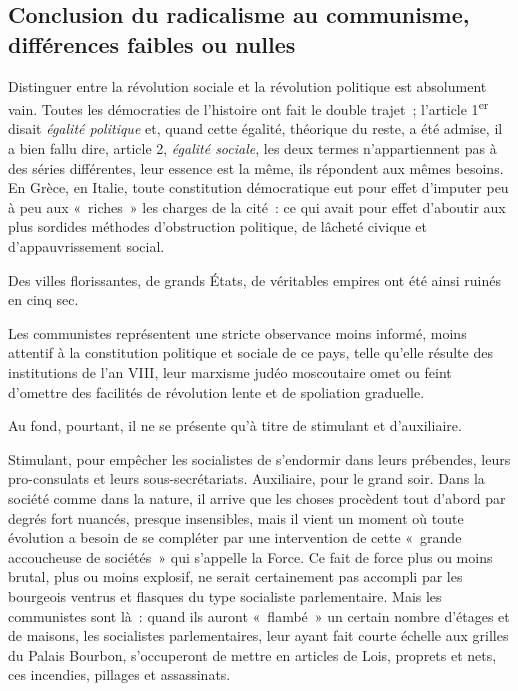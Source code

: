 \documentclass[french,twoside]{book} %
\newcommand{\astermono}{\medskip\centerline{\color{rubric}\large\selectfont{\syms ✻}}\medskip\par}%
\begin{document}
\astermono

\subsection[Conclusion du radicalisme au communisme, différences faibles ou nulles]{Conclusion du radicalisme au communisme, différences faibles ou nulles}
\noindent Distinguer entre la révolution sociale et la révolution politique est absolument vain. Toutes les démocraties de l’histoire ont fait le double trajet ; l’article 1\textsuperscript{er} disait \emph{égalité politique} et, quand cette égalité, théorique du reste, a été admise, il a bien fallu dire, article 2, \emph{égalité sociale}, les deux termes n’appartiennent pas à des séries différentes, leur essence est la même, ils répondent aux mêmes besoins. En Grèce, en Italie, toute constitution démocratique eut pour effet d’imputer peu à peu aux « riches » les charges de la cité : ce qui avait pour effet d’aboutir aux plus sordides méthodes d’obstruction politique, de lâcheté civique et d’appauvrissement social.\par
Des villes florissantes, de grands États, de véritables empires ont été ainsi ruinés en cinq sec.\par

\astermono

\noindent Les communistes représentent une stricte observance moins informé, moins attentif à la constitution politique et sociale de ce pays, telle qu’elle résulte des institutions de l’an VIII, leur marxisme judéo moscoutaire omet ou feint d’omettre des facilités de révolution lente et de spoliation graduelle.\par
Au fond, pourtant, il ne se présente qu’à titre de stimulant et d’auxiliaire.\par
Stimulant, pour empêcher les socialistes de s’endormir dans leurs prébendes, leurs pro-consulats et leurs sous-secrétariats. Auxiliaire, pour le grand soir. Dans la société comme dans la nature, il arrive que les choses procèdent tout d’abord par degrés fort nuancés, presque insensibles, mais il vient un moment où toute évolution a besoin de se compléter par une intervention de cette « grande accoucheuse de sociétés » qui s’appelle la Force. Ce fait de force plus ou moins brutal, plus ou moins explosif, ne serait certainement pas accompli par les bourgeois ventrus et flasques du type socialiste parlementaire. Mais les communistes sont là : quand ils auront « flambé » un certain nombre d’étages et de maisons, les socialistes parlementaires, leur ayant fait courte échelle aux grilles du Palais Bourbon, s’occuperont de mettre en articles de Lois, proprets et nets, ces incendies, pillages et assassinats.\par
\end{document}
